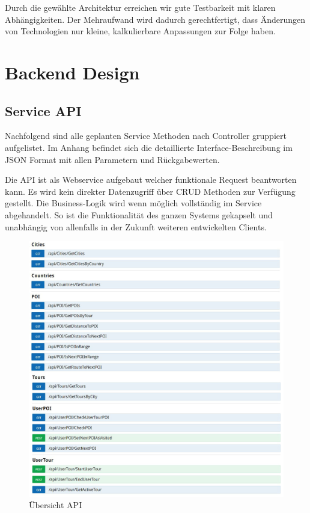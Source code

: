 \documentclass[a4paper,10pt,xetex]{article}
\begin{document}
Durch die gewählte Architektur erreichen wir gute Testbarkeit mit klaren
Abhängigkeiten. Der Mehraufwand wird dadurch gerechtfertigt, dass Änderungen
von Technologien nur kleine, kalkulierbare Anpassungen zur Folge haben.

\section{Backend Design}\label{backend-design}
\subsection{Service API}\label{service-api}

Nachfolgend sind alle geplanten Service Methoden nach Controller gruppiert aufgelistet. Im Anhang befindet sich die
detaillierte Interface-Beschreibung im JSON Format mit allen Parametern und R\"uckgabewerten.

Die API ist als Webservice aufgebaut welcher funktionale Request beantworten kann. Es wird kein direkter Datenzugriff
\"uber CRUD Methoden zur Verf\"ugung gestellt. Die Business-Logik wird wenn m\"oglich vollst\"andig im Service
abgehandelt. So ist die Funktionalit\"at des ganzen Systems gekapselt und unabh\"angig von allenfalls in der Zukunft
weiteren entwickelten Clients.

\begin{figure}
  \centering
  \includegraphics{swagger}
  \caption{Übersicht API}
\end{figure}
\end{document}
